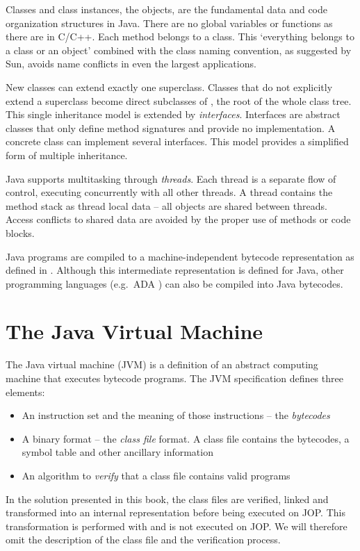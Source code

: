 Classes and class instances, the objects, are the fundamental data
and code organization structures in Java. There are no global
variables or functions as there are in C/C++. Each method belongs to
a class. This `everything belongs to a class or an object' combined
with the class naming convention, as suggested by Sun, avoids name
conflicts in even the largest applications.

New classes can extend exactly one superclass. Classes that do not
explicitly extend a superclass become direct subclasses of
, the root of the whole class tree. This single
inheritance model is extended by \emph{interfaces}. Interfaces are
abstract classes that only define method signatures and provide no
implementation. A concrete class can implement several interfaces.
This model provides a simplified form of multiple inheritance.

Java supports multitasking through \emph{threads}. Each thread is a
separate flow of control, executing concurrently with all other
threads. A thread contains the method stack as thread local data --
all objects are shared between threads. Access conflicts to shared
data are avoided by the proper use of  methods or
code blocks.

Java programs are compiled to a machine-independent bytecode
representation as defined in \cite{jvm}. Although this intermediate
representation is defined for Java, other programming languages
(e.g.\ ADA \cite{269646}) can also be compiled into Java bytecodes.

\section{The Java Virtual Machine}

The Java virtual machine (JVM) is a definition of an abstract
computing machine that executes bytecode programs. The JVM
specification \cite{jvm} defines three elements:
\begin{itemize}
    \item An instruction set and the meaning of those instructions
    -- the \emph{bytecodes}
    \item A binary format -- the \emph{class file} format. A
    class file contains the bytecodes, a symbol table and other
    ancillary information
    \item An algorithm to \emph{verify} that a class file
    contains valid programs
\end{itemize}
%
In the solution presented in this book, the class files are
verified, linked and transformed into an internal representation
before being executed on JOP. This transformation is performed with
 and is not executed on JOP. We will therefore omit the
description of the class file and the verification process.

